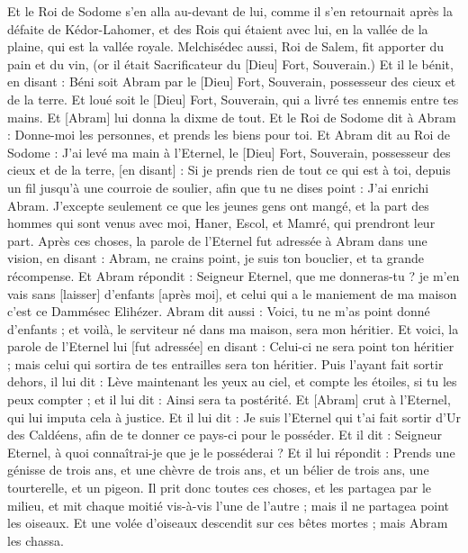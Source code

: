 \begin{multicols}{2}
Et le Roi de Sodome s'en alla au-devant de lui, comme il s'en retournait après la défaite de Kédor-Lahomer, et des Rois qui étaient avec lui, en la vallée de la plaine, qui est la vallée royale.
Melchisédec aussi, Roi de Salem, fit apporter du pain et du vin, (or il était Sacrificateur du [Dieu] Fort, Souverain.)
Et il le bénit, en disant : Béni soit Abram par le [Dieu] Fort, Souverain, possesseur des cieux et de la terre.
Et loué soit le [Dieu] Fort, Souverain, qui a livré tes ennemis entre tes mains. Et [Abram] lui donna la dixme de tout.
Et le Roi de Sodome dit à Abram : Donne-moi les personnes, et prends les biens pour toi.
Et Abram dit au Roi de Sodome : J'ai levé ma main à l'Eternel, le [Dieu] Fort, Souverain, possesseur des cieux et de la terre, [en disant] :
Si je prends rien de tout ce qui est à toi, depuis un fil jusqu'à une courroie de soulier, afin que tu ne dises point : J'ai enrichi Abram.
J'excepte seulement ce que les jeunes gens ont mangé, et la part des hommes qui sont venus avec moi, Haner, Escol, et Mamré, qui prendront leur part.
\VerseOne{}Après ces choses, la parole de l'Eternel fut adressée à Abram dans une vision, en disant : Abram, ne crains point, je suis ton bouclier, et ta grande récompense.
Et Abram répondit : Seigneur Eternel, que me donneras-tu ? je m'en vais sans [laisser] d'enfants [après moi], et celui qui a le maniement de ma maison c'est ce Dammésec Elihézer.
Abram dit aussi : Voici, tu ne m'as point donné d'enfants ; et voilà, le serviteur né dans ma maison, sera mon héritier.
Et voici, la parole de l'Eternel lui [fut adressée] en disant : Celui-ci ne sera point ton héritier ; mais celui qui sortira de tes entrailles sera ton héritier.
Puis l'ayant fait sortir dehors, il lui dit : Lève maintenant les yeux au ciel, et compte les étoiles, si tu les peux compter ; et il lui dit : Ainsi sera ta postérité.
Et [Abram] crut à l'Eternel, qui lui imputa cela à justice.
Et il lui dit : Je suis l'Eternel qui t'ai fait sortir d'Ur des Caldéens, afin de te donner ce pays-ci pour le posséder.
Et il dit : Seigneur Eternel, à quoi connaîtrai-je que je le posséderai ?
Et il lui répondit : Prends une génisse de trois ans, et une chèvre de trois ans, et un bélier de trois ans, une tourterelle, et un pigeon.
Il prit donc toutes ces choses, et les partagea par le milieu, et mit chaque moitié vis-à-vis l'une de l'autre ; mais il ne partagea point les oiseaux.
Et une volée d'oiseaux descendit sur ces bêtes mortes ; mais Abram les chassa.

\end{multicols}
